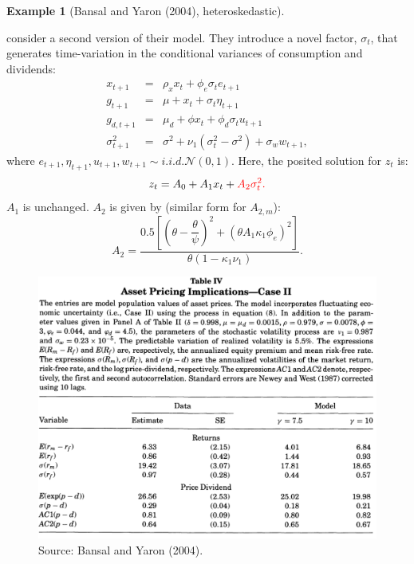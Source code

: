 \documentclass[
  12pt,
]{book}
\theoremstyle{definition}
\theoremstyle{definition}
\newtheorem{example}{Example}[chapter]
\theoremstyle{definition}
\theoremstyle{definition}
\theoremstyle{remark}
\begin{document}
\begin{example}[Bansal and Yaron (2004), heteroskedastic]
\protect\hypertarget{exm:BYHeterosk}{}\label{exm:BYHeterosk}

\citet{Bansal_Yaron_2004} consider a second version of their model. They introduce a novel factor, \(\sigma_t\), that generates time-variation in the conditional variances of consumption and dividends:
\begin{eqnarray}
x_{t+1} &=& \rho_x x_t + \phi_e \sigma_t e_{t+1} \nonumber\\
g_{t+1} &=& \mu + x_t + \sigma_t \eta_{t+1} \nonumber\\
g_{d,t+1} &=& \mu_d + \phi x_t + \phi_d \sigma_t u_{t+1} \nonumber\\
\sigma_{t+1}^2 &=& \sigma^2 + \nu_1(\sigma^2_t -\sigma^2) + \sigma_w w_{t+1}, \label{eq:BYheteroscked}
\end{eqnarray}
where \(e_{t+1},\eta_{t+1},u_{t+1},w_{t+1} \sim i.i.d. \mathcal{N}(0,1)\).
Here, the posited solution for \(z_t\) is:
\[
z_t = A_0 + A_1 x_t + \color{red}{A_2 \sigma^2_t}.
\]
\(A_1\) is unchanged. \(A_2\) is given by (similar form for \(A_{2,m}\)):
\[
A_2 = \frac{0.5 \left[ \left(\theta - \dfrac{\theta}{\psi}\right)^2 + (\theta A_1 \kappa_1 \phi_e)^2 \right]}{\theta(1 - \kappa_1 \nu_1)}.
\]

\begin{figure}

{\centering \includegraphics[width=1\linewidth]{figures/table_BY4} 

}

\caption{Source: Bansal and Yaron (2004).}\label{fig:BY4}
\end{figure}

\end{example}
\end{document}
